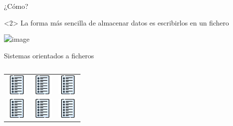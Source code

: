 
\begin{frame}{¿C\'omo?}
    \begin{block}<2>{}
        La forma m\'as sencilla de almacenar datos es escribirlos en un fichero
    \end{block}
    \vspace{5mm}

    \centering
    \includegraphics<2>[width=50mm, height=50mm]{img/csv.png}


\end{frame}


\begin{frame}{Sistemas orientados a ficheros}
   
    \begin{columns}[T]
        \begin{column}{0.30\linewidth}
            \begin{block}
                
                \begin{tabular}{c c c}
    
                    \includegraphics[width=1cm]{img/list.png}
                    
                    & \includegraphics[width=1cm]{img/list.png}
                    & \includegraphics[width=1cm]{img/list.png}\\
    
                    \includegraphics[width=1cm]{img/list.png}
                    & \includegraphics[width=1cm]{img/list.png}
                    & \includegraphics[width=1cm]{img/list.png}\\
    

\end{tabular}
\end{block}
\end{column}
\end{columns}
\end{frame}
